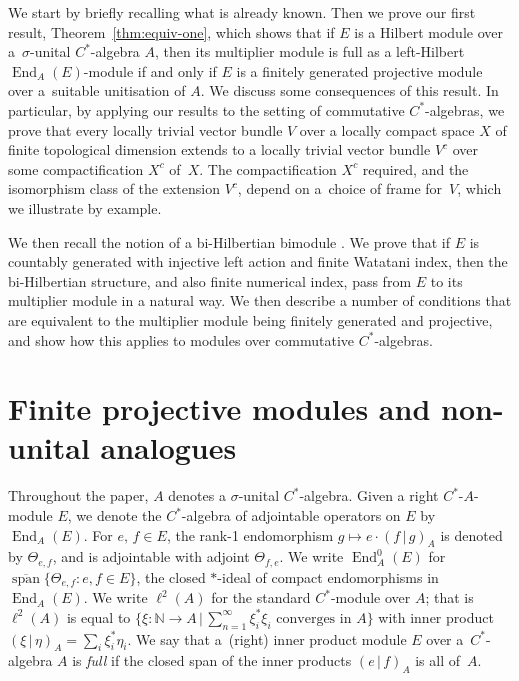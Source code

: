 \documentclass[10pt,a4paper]{amsart}
\numberwithin{equation}{section}
\DeclareMathOperator{\End}{End} %
\DeclareMathOperator{\linspan}{span} %
\newcommand{\N}{\mathbb{N}} %
\begin{document}
We start by brief\/ly recalling what is already known. Then we prove our f\/irst result, Theo\-rem~\ref{thm:equiv-one}, which shows that if $E$ is a Hilbert module over a~$\sigma$-unital $C^*$-algebra $A$, then its multiplier module is full as a left-Hilbert $\End_A(E)$-module if and only if $E$ is a f\/initely generated projective module over a~suitable unitisation of $A$. We discuss some consequences of this result. In particular, by applying our results to the setting of commutative $C^*$-algebras, we prove that every locally trivial vector bundle $V$ over a locally compact space $X$ of f\/inite topological dimension extends to a locally trivial vector bundle $V^c$ over some compactif\/ication $X^c$ of~$X$. The compactif\/ication $X^c$ required, and the isomorphism class of the extension $V^c$, depend on a~choice of frame for~$V$, which we illustrate by example.

We then recall the notion of a bi-Hilbertian bimodule \cite{KajPinWat}. We prove that if $E$ is countably generated with injective left action and f\/inite Watatani index, then the bi-Hilbertian structure, and also f\/inite numerical index, pass from $E$ to its multiplier module in a natural way. We then describe a number of conditions that are equivalent to the multiplier module being f\/initely generated and projective, and show how this applies to modules over commutative $C^*$-algebras.

\section{Finite projective modules and non-unital analogues}
\label{sec:fgps} Throughout the paper, $A$ denotes a $\sigma$-unital $C^*$-algebra. Given a right $C^*$-$A$-module $E$, we denote the $C^*$-algebra of adjointable operators on $E$ by $\End_A(E)$. For $e,\,f\in E$, the \mbox{rank-1} endomorphism $g \mapsto e \cdot (f \,|\, g)_A$ is denoted by $\Theta_{e,f}$, and is adjointable with adjoint $\Theta_{f,e}$. We write $\End_A^0(E)$ for $\overline{\linspan}\{\Theta_{e,f} \colon e,f \in E\}$, the closed $*$-ideal of compact endomorphisms in $\End_A(E)$. We write $\ell^2(A)$ for the standard $C^*$-module over $A$; that is $\ell^2(A)$ is equal to $\big\{\xi \colon \N \to A \,|\, \sum\limits^\infty_{n=1} \xi_i^*\xi_i\text{ converges in }A\big\}$ with inner product $(\xi \,|\, \eta)_A = \sum_i \xi^*_i \eta_i$. We say that a~(right) inner product module $E$ over a~$C^*$-algebra $A$ is \emph{full} if the closed span of the inner products $(e\,|\, f)_A$ is all of~$A$.
\end{document}
